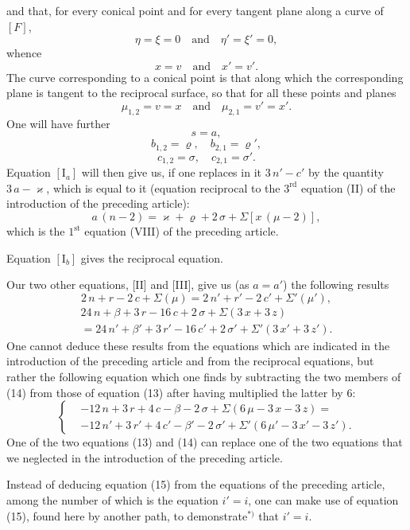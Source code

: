 \documentclass{article}
\begin{document}
and that, for every conical point and for every tangent plane along a curve of $[F]$,
\[
\eta = \xi = 0 \quad\text{and}\quad \eta' = \xi' = 0,
\]
whence
\[
x = v \quad\text{and}\quad x' = v'.
\]
The curve corresponding to a conical point is that along which the corresponding plane is tangent to the reciprocal surface, so that for all these points and planes
\[
\mu_{1, 2} = v = x \quad\text{and}\quad \mu_{2, 1} = v' = x'.
\]
One will have further
\[
s = a,
\]
\[
b_{1, 2} = \varrho, \quad b_{2, 1} = \varrho',
\]
\[
c_{1, 2} = \sigma, \quad c_{2, 1} = \sigma'.
\]
Equation $[\mathrm{I}_a]$ will then give us, if one replaces in it $3\,n' - c'$ by the quantity $3\,a - \varkappa$, which is equal to it (equation reciprocal to the $3^{\text{rd}}$ equation (II) of the introduction of the preceding article):
\[
a\,(n - 2) = \varkappa + \varrho + 2\,\sigma + \Sigma[x\,(\mu - 2)],
\]
which is the $1^{\text{st}}$ equation (VIII) of the preceding article.

Equation $[\mathrm{I}_b]$ gives the reciprocal equation.

Our two other equations, [II] and [III], give us (as $a = a'$) the following results
\[
2\,n + r - 2\,c + \Sigma(\mu) = 2\,n' + r' - 2\,c' + \Sigma'(\mu'), \tag{13}
\]
\[
\begin{aligned}
24\,n + \beta + 3\,r - 16\,c + 2\,\sigma + \Sigma(3\,x + 3\,z) \\
= 24\,n' + \beta' + 3\,r' - 16\,c' + 2\,\sigma' + \Sigma'(3\,x' + 3\,z').
\end{aligned} \tag{14}
\]
One cannot deduce these results from the equations which are indicated in the introduction of the preceding article and from the reciprocal equations, but rather the following equation which one finds by subtracting the two members of (14) from those of equation (13) after having multiplied the latter by $6$:
\[
\left\{
\begin{aligned}
& - 12\,n + 3\,r + 4\,c - \beta - 2\,\sigma + \Sigma(6\,\mu - 3\,x - 3\,z) = \\
& - 12\,n' + 3\,r' + 4\,c' - \beta' - 2\,\sigma' + \Sigma'(6\,\mu' - 3\,x' - 3\,z').
\end{aligned}
\right. \tag{15}
\]
One of the two equations (13) and (14) can replace one of the two equations that we neglected in the introduction of the preceding article.

Instead of deducing equation (15) from the equations of the preceding article, among the number of which is the equation $i' = i$, one can make use of equation (15), found here by another path, to demonstrate${}^{*)}$ that $i' = i$.
\end{document}
